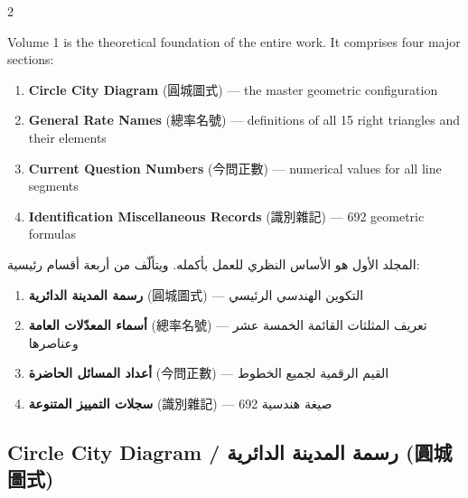 \documentclass[11pt,a4paper]{article}
\newcommand{\ar}[1]{\arabicfont\beginR #1\endR}
\begin{document}
\begin{paracol}{2}

Volume 1 is the theoretical foundation of the entire work. It comprises four major sections:

\begin{enumerate}[leftmargin=2em]
  \item \textbf{Circle City Diagram} (圓城圖式) --- the master geometric configuration
  \item \textbf{General Rate Names} (總率名號) --- definitions of all 15 right triangles and their elements
  \item \textbf{Current Question Numbers} (今問正數) --- numerical values for all line segments
  \item \textbf{Identification Miscellaneous Records} (識別雜記) --- 692 geometric formulas
\end{enumerate}

\switchcolumn

\ar{المجلد الأول هو الأساس النظري للعمل بأكمله. ويتألّف من أربعة أقسام رئيسية:}

\begin{enumerate}[leftmargin=2em,rightmargin=0em]
  \item \ar{\textbf{رسمة المدينة الدائرية} (圓城圖式) — التكوين الهندسي الرئيسي}
  \item \ar{\textbf{أسماء المعدّلات العامة} (總率名號) — تعريف المثلثات القائمة الخمسة عشر وعناصرها}
  \item \ar{\textbf{أعداد المسائل الحاضرة} (今問正數) — القيم الرقمية لجميع الخطوط}
  \item \ar{\textbf{سجلات التمييز المتنوعة} (識別雜記) — 692 صيغة هندسية}
\end{enumerate}

\end{paracol}

\subsection{Circle City Diagram / \ar{رسمة المدينة الدائرية} (圓城圖式)}
\label{subsec:diagram}
\end{document}
